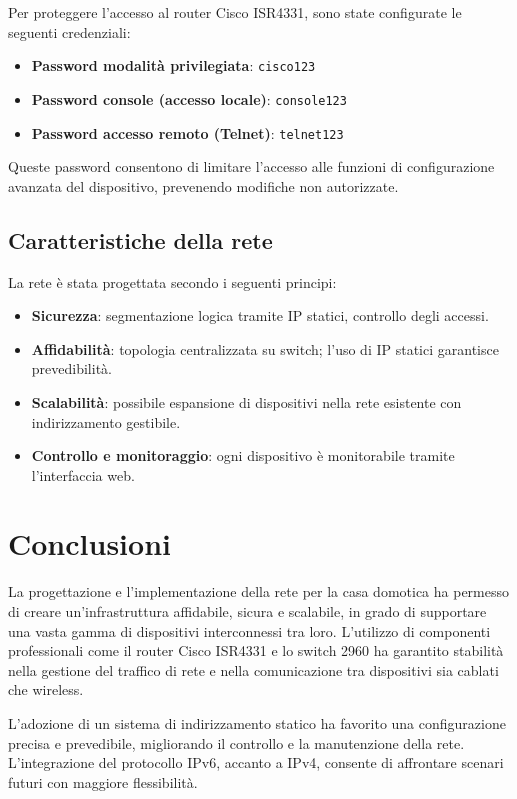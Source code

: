 \documentclass[a4paper,12pt]{article}
\begin{document}
Per proteggere l’accesso al router Cisco ISR4331, sono state configurate le seguenti credenziali:

\begin{itemize}
    \item \textbf{Password modalità privilegiata}: \texttt{cisco123}
    \item \textbf{Password console (accesso locale)}: \texttt{console123}
    \item \textbf{Password accesso remoto (Telnet)}: \texttt{telnet123}
\end{itemize}

Queste password consentono di limitare l’accesso alle funzioni di configurazione avanzata del dispositivo, prevenendo modifiche non autorizzate.

\subsection{Caratteristiche della rete}

La rete è stata progettata secondo i seguenti principi:

\begin{itemize}
    \item \textbf{Sicurezza}: segmentazione logica tramite IP statici, controllo degli accessi.
    \item \textbf{Affidabilità}: topologia centralizzata su switch; l’uso di IP statici garantisce prevedibilità.
    \item \textbf{Scalabilità}: possibile espansione di dispositivi nella rete esistente con indirizzamento gestibile.
    \item \textbf{Controllo e monitoraggio}: ogni dispositivo è monitorabile tramite l’interfaccia web.
\end{itemize}

\section*{Conclusioni}

La progettazione e l’implementazione della rete per la casa domotica ha permesso di creare un’infrastruttura affidabile, sicura e scalabile, in grado di supportare una vasta gamma di dispositivi interconnessi tra loro. L’utilizzo di componenti professionali come il router Cisco ISR4331 e lo switch 2960 ha garantito stabilità nella gestione del traffico di rete e nella comunicazione tra dispositivi sia cablati che wireless.

L’adozione di un sistema di indirizzamento statico ha favorito una configurazione precisa e prevedibile, migliorando il controllo e la manutenzione della rete. L’integrazione del protocollo IPv6, accanto a IPv4, consente di affrontare scenari futuri con maggiore flessibilità.
\end{document}
